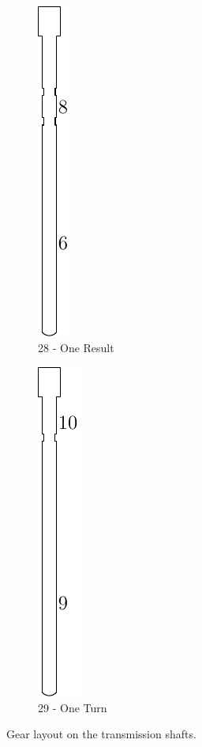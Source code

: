 \documentclass[openany]{book}
\begin{document}
\begin{figure}[!ht]
	\begin{subfigure}{.2\textwidth}
		\centering
		\includegraphics[scale=1]{images/transmission-result-one-gear.pdf}
		\caption{28 - One Result}
		\label{fig:transmission:resultgear}	
	\end{subfigure}
	\begin{subfigure}{.2\textwidth}
		\centering
		\includegraphics[scale=1]{images/transmission-turns-one-gear.pdf}
		\caption{29 - One Turn}
		\label{fig:transmission:turnsgear}	
	\end{subfigure}
	\caption{Gear layout on the transmission shafts.}
	\label{fig:transmission:gearlayout}
\end{figure}
\end{document}
